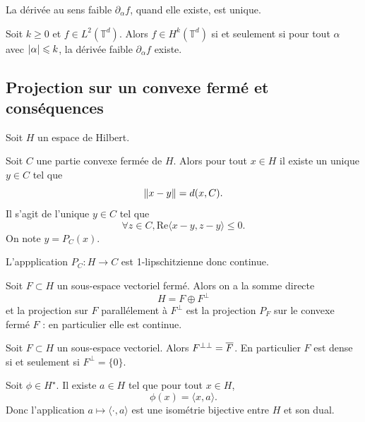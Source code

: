 \documentclass[twocolumn, landscape]{article}
\begin{document}
\begin{rema}
    La dérivée au sens faible $\partial_\alpha f$, quand elle existe, est unique.
\end{rema}

\begin{prop}
    Soit $k\geq 0$ et $f \in L^2(\mathbb{T}^d)$. Alors $f \in H^k(\mathbb{T}^d)$ si et seulement si pour tout $\alpha$ avec $\left\lvert \alpha \right\rvert \leqslant k$, la dérivée faible $\partial_\alpha f$ existe.
\end{prop}

\subsection{Projection sur un convexe fermé et conséquences \cite{Li}}

Soit $H$ un espace de Hilbert.

\begin{theo}
    Soit $C$ une partie convexe fermée de $H$. Alors pour tout $x \in H$ il existe un unique $y \in C$ tel que $$\left\lVert x - y \right\rVert = d(x,C).$$
    Il s'agit de l'unique $y \in C$ tel que $$\forall z \in C, \mathrm{Re} \langle x- y, z-y \rangle \leq 0.$$
    On note $y=P_C(x)$.
\end{theo}

\begin{prop}
    L'appplication $P_C : H \to C$ est 1-lipschitzienne donc continue.
\end{prop}

\begin{theo}
    Soit $F \subset H$ un sous-espace vectoriel fermé. Alors on a la somme directe $$H = F \oplus F^\bot$$
    et la projection sur $F$ parallélement à $F^\bot$ est la projection $P_F$ sur le convexe fermé $F$ : en particulier elle est continue. 
\end{theo}

\begin{coro}
    Soit $F \subset H$ un sous-espace vectoriel. Alors $F^{\bot \bot} = \overline{F}$. En particulier $F$ est dense si et seulement si $F^\bot = \{0\}$. 
\end{coro}

\begin{theo}
    Soit $\phi \in H^\star$. Il existe $a \in H$ tel que pour tout $x\in H$, $$\phi(x) = \langle x, a\rangle.$$
    Donc l'application $a \mapsto \langle \cdot, a \rangle$ est une isométrie bijective entre $H$ et son dual. 
\end{theo}
\end{document}
